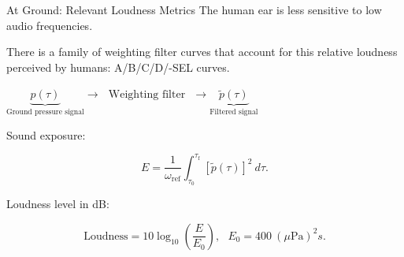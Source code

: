 \documentclass{beamer}
\newcounter{sectionframes}
\newcommand{\setsectionframes}[1]{%
  \setcounter{sectionframes}{#1}%
}
\newcounter{sectionframecount}
\begin{document}
\setsectionframes{3}


\begin{frame}[t]{At Ground: Relevant Loudness Metrics}
\vspace{-10pt}
The human ear is less sensitive to low audio frequencies.

\vspace{10pt}
There is a family of weighting filter curves that account for this relative loudness perceived by humans: A/B/C/D/-SEL curves.

{
\vspace{10pt}
$\underbrace{p(\tau)}_{\text{Ground pressure signal}}\to~~~\text{Weighting filter}~~~\to\underbrace{\tilde{p}(\tau)}_{\text{Filtered signal}}$
}

{
\vspace{10pt}
Sound exposure:

\begin{equation}
  E = \dfrac{1}{\omega_{\text{ref}}}\int_{\tau_0}^{\tau_{\text{f}}} [\tilde{p}(\tau)]^2~d\tau.
\end{equation}
}

{
\vspace{4pt}
Loudness level in dB:

\begin{equation}
  \text{Loudness} = 10\log_{10}\left(\dfrac{E}{E_0}\right),~~~ E_0 = 400~ (\mu\text{Pa})^2s.
\end{equation}
}

\end{frame}

\end{document}
